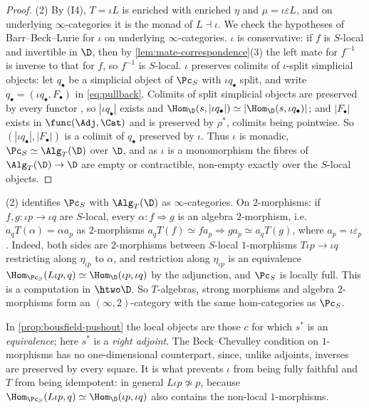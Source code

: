 \begin{proof}
(2) By (I4), $T = \iota L$ is enriched with enriched $\eta$ and $\mu = \iota\varepsilon L$, and on underlying $\infty$-categories it is the monad of $L \dashv \iota$.
We check the hypotheses of Barr--Beck--Lurie \cite[4.7.3.5]{ha} for $\iota$ on underlying $\infty$-categories.
$\iota$ is conservative: if $f$ is $S$-local and invertible in $\D$, then by \cref{lem:mate-correspondence}(3) the left mate for $f^{-1}$ is inverse to that for $f$, so $f^{-1}$ is $S$-local.
$\iota$ preserves colimits of $\iota$-split simplicial objects: let $q_{\bullet}$ be a simplicial object of $\Pc_{S}$ with $\iota q_{\bullet}$ split, and write $q_{\bullet} = (\iota q_{\bullet},F_{\bullet})$ in \eqref{eq:pullback}. Colimits of split simplicial objects are preserved by every functor \cite[6.1.3.16]{htt}, so $|\iota q_{\bullet}|$ exists and $\Hom_{\D}(s,|\iota q_{\bullet}|) \simeq |\Hom_{\D}(s,\iota q_{\bullet})|$; and $|F_{\bullet}|$ exists in $\func(\Adj,\Cat)$ and is preserved by $\rho^{*}$, colimits being pointwise. So $(|\iota q_{\bullet}|,|F_{\bullet}|)$ is a colimit of $q_{\bullet}$ preserved by $\iota$.
Thus $\iota$ is monadic, $\Pc_{S} \simeq \Alg_{T}(\D)$ over $\D$, and as $\iota$ is a monomorphism the fibres of $\Alg_{T}(\D) \to \D$ are empty or contractible, non-empty exactly over the $S$-local objects.
\end{proof}

\begin{rmk}
\label{rmk:eilenberg-moore-enriched}
(2) identifies $\Pc_{S}$ with $\Alg_{T}(\D)$ as $\infty$-categories. On $2$-morphisms: if $f,g\colon \iota p \to \iota q$ are $S$-local, every $\alpha\colon f \Rightarrow g$ is an algebra $2$-morphism, i.e.\ $a_{q}T(\alpha) = \alpha a_{p}$ as $2$-morphisms $a_{q}T(f) \simeq fa_{p} \Rightarrow ga_{p} \simeq a_{q}T(g)$, where $a_{p} = \iota\varepsilon_{p}$. Indeed, both sides are $2$-morphisms between $S$-local $1$-morphisms $T\iota p \to \iota q$ restricting along $\eta_{\iota p}$ to $\alpha$, and restriction along $\eta_{\iota p}$ is an equivalence $\Hom_{\Pc_{S}}(L\iota p,q) \simeq \Hom_{\D}(\iota p,\iota q)$ by the adjunction, and $\Pc_{S}$ is locally full. This is a computation in $\htwo\D$. So $T$-algebras, strong morphisms and algebra $2$-morphisms form an $(\infty,2)$-category with the same hom-categories as $\Pc_{S}$.
\end{rmk}

\begin{rmk}
\label{rmk:2dloc-compare-bousfield}
In \cref{prop:bousfield-pushout} the local objects are those $c$ for which $s^{*}$ is an \emph{equivalence}; here $s^{*}$ is a \emph{right adjoint}.
The Beck--Chevalley condition on $1$-morphisms has no one-dimensional counterpart, since, unlike adjoints, inverses are preserved by every square.
It is what prevents $\iota$ from being fully faithful and $T$ from being idempotent: in general $L\iota p \not\simeq p$, because $\Hom_{\Pc_{S}}(L\iota p,q) \simeq \Hom_{\D}(\iota p,\iota q)$ also contains the non-local $1$-morphisms.
\end{rmk}
